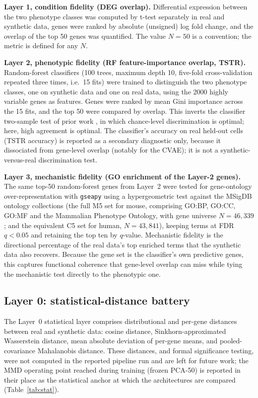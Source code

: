 \documentclass[11pt]{article}
\begin{document}
\noindent\textbf{Layer 1, condition fidelity (DEG overlap).} Differential expression between the two phenotype classes was computed by t-test separately in real and synthetic data, genes were ranked by absolute (unsigned) log fold change, and the overlap of the top 50 genes was quantified. The value $N=50$ is a convention; the metric is defined for any $N$.

\noindent\textbf{Layer 2, phenotypic fidelity (RF feature-importance overlap, TSTR).} Random-forest classifiers (100 trees, maximum depth 10, five-fold cross-validation repeated three times, i.e.\ 15 fits) were trained to distinguish the two phenotype classes, one on synthetic data and one on real data, using the 2000 highly variable genes as features. Genes were ranked by mean Gini importance across the 15 fits, and the top 50 were compared by overlap. This inverts the classifier two-sample test of prior work \cite{scgan,scdiffusion,lopezpaz}, in which chance-level discrimination is optimal; here, high agreement is optimal. The classifier's accuracy on real held-out cells (TSTR accuracy) is reported as a secondary diagnostic only, because it dissociated from gene-level overlap (notably for the CVAE); it is not a synthetic-versus-real discrimination test.

\noindent\textbf{Layer 3, mechanistic fidelity (GO enrichment of the Layer-2 genes).} The same top-50 random-forest genes from Layer~2 were tested for gene-ontology over-representation with \texttt{gseapy} \cite{gseapy} using a hypergeometric test against the MSigDB ontology collections \cite{msigdb} (the full M5 set for mouse, comprising GO:BP, GO:CC, GO:MF and the Mammalian Phenotype Ontology, with gene universe $N=46{,}339$; and the equivalent C5 set for human, $N=43{,}841$), keeping terms at FDR $q<0.05$ and retaining the top ten by $q$-value. Mechanistic fidelity is the directional percentage of the real data's top enriched terms that the synthetic data also recovers. Because the gene set is the classifier's own predictive genes, this captures functional coherence that gene-level overlap can miss while tying the mechanistic test directly to the phenotypic one.

\subsection{Layer 0: statistical-distance battery}
The Layer~0 statistical layer comprises distributional and per-gene distances between real and synthetic data: cosine distance, Sinkhorn-approximated Wasserstein distance, mean absolute deviation of per-gene means, and pooled-covariance Mahalanobis distance. These distances, and formal significance testing, were not computed in the reported pipeline run and are left for future work; the MMD operating point reached during training (frozen PCA-50) is reported in their place as the statistical anchor at which the architectures are compared (Table~\ref{tab:stat}).
\end{document}
